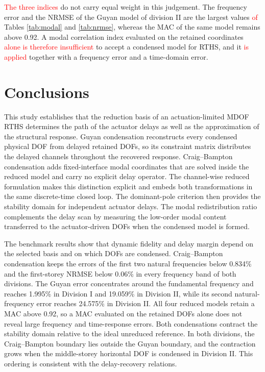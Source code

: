 \documentclass[11pt,a4paper]{article}
\numberwithin{equation}{section}
\newcommand{\rev}[1]{\textcolor{red}{#1}}
\begin{document}
\rev{The three indices} do not carry equal weight in this judgement. The frequency error and the NRMSE of the Guyan model of division II are the largest values \rev{of} Tables \ref{tab:modal} and \ref{tab:nrmse}, whereas the MAC of the same model remains above 0.92. A modal correlation index evaluated on the retained coordinates \rev{alone is therefore insufficient} to accept a condensed model for RTHS, and it \rev{is applied} together with a frequency error and a time-domain error.




\section{Conclusions}\label{sec6}

This study establishes that the reduction basis of an actuation-limited MDOF RTHS determines the path of the actuator delays as well as the approximation of the structural response. Guyan condensation reconstructs every condensed physical DOF from delayed retained DOFs, so its constraint matrix distributes the delayed channels throughout the recovered response. Craig--Bampton condensation adds fixed-interface modal coordinates that are solved inside the reduced model and carry no explicit delay operator. The channel-wise reduced formulation makes this distinction explicit and embeds both transformations in the same discrete-time closed loop. The dominant-pole criterion then provides the stability domain for independent actuator delays. The modal redistribution ratio complements the delay scan by measuring the low-order modal content transferred to the actuator-driven DOFs when the condensed model is formed.

The benchmark results show that dynamic fidelity and delay margin depend on the selected basis and on which DOFs are condensed. Craig--Bampton condensation keeps the errors of the first two natural frequencies below 0.834\% and the first-storey NRMSE below 0.06\% in every frequency band of both divisions. The Guyan error concentrates around the fundamental frequency and reaches 1.995\% in Division I and 19.059\% in Division II, while its second natural-frequency error reaches 24.575\% in Division II. All four reduced models retain a MAC above 0.92, so a MAC evaluated on the retained DOFs alone does not reveal large frequency and time-response errors. Both condensations contract the stability domain relative to the ideal unreduced reference. In both divisions, the Craig--Bampton boundary lies outside the Guyan boundary, and the contraction grows when the middle-storey horizontal DOF is condensed in Division II. This ordering is consistent with the delay-recovery relations.
\end{document}
